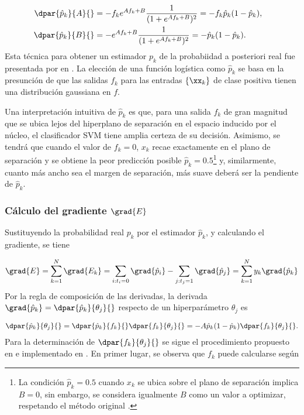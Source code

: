 \begin{align*}
  \dpar{\hat{p}_k}{A}{}&=-f_k e^{Af_k+B}\frac{1}{(1+e^{Af_k+B})^2}
  =-f_k\hat{p}_k(1-\hat{p}_k),&\\
  \dpar{\hat{p}_k}{B}{}&=    -e^{Af_k+B}\frac{1}{(1+e^{Af_k+B})^2}
  =-   \hat{p}_k(1-\hat{p}_k).
\end{align*}
Esta técnica para obtener un estimador $p_k$ de la probabiidad a
posteriori real fue presentada por \citeauthor{platt} en \cite{platt}.
La elección de una función logística como $\hat{p}_k$ se basa en la
presunción de que las salidas $f_k$ para las entradas $\{\xx_k\}$ de
clase positiva tienen una distribución gaussiana en $f$.

Una interpretación intuitiva de $\hat{p}_k$ es que, para una salida
$f_k$ de gran magnitud que se ubica lejos del hiperplano de separación
en el espacio inducido por el núcleo, el clasificador SVM tiene amplia
certeza de su decisión.  Asimismo, se tendrá que cuando el valor de
$f_k=0$, $x_k$ recae exactamente en el plano de separación y se
obtiene la peor predicción posible $\hat{p}_k=0.5$\footnote{La
  condición $\hat{p}_k=0.5$ cuando $x_k$ se ubica sobre el plano de
  separación implica $B=0$, sin embargo, se considera igualmente $B$
  como un valor a optimizar, respetando el método original
  \cite{platt}.} y, similarmente, cuanto más ancho sea el margen de
separación, más suave deberá ser la pendiente de $\hat{p}_k$.

\subsubsection{Cálculo del gradiente $\grad{E}$}
Sustituyendo la probabilidad real $p_k$ por el estimador
$\hat{p}_k$, y calculando el gradiente, se tiene

\begin{align}
\label{gradE}
  \grad{E} = \sum_{k=1}^{N} \grad{E_k} =
  \sum_{ i:t_i=0  } \grad{\hat{p}_i}
  - \sum_{ j:t_j=1  } \grad{\hat{p}_j}
  = \sum_{k=1}^{N} y_k \grad{\hat{p}_k}
\end{align}
Por la regla de composición de las derivadas, la derivada
$\grad{\hat{p}_k}=\dpar{\hat{p}_k}{\theta_j}{}$ respecto de un
hiperparámetro ${\theta_j}$ es

\begin{align}
  \dpar{\hat{p}_k}{\theta_j}{} =
  \dpar{\hat{p}_k}{f_k}{}\dpar{f_k}{\theta_j}{} =
  -A\hat{p}_k(1-\hat{p}_k)\dpar{f_k}{\theta_j}{}.
  \label{eq:deriv-pk-thetak}
\end{align}
Para la determinación de $\dpar{f_k}{\theta_j}{}$ se sigue el
procedimiento propuesto en \cite{keerthi,glasmachers} e implementado
en \cite{shark}.
En primer lugar, se observa que $f_k$ puede calcularse según


